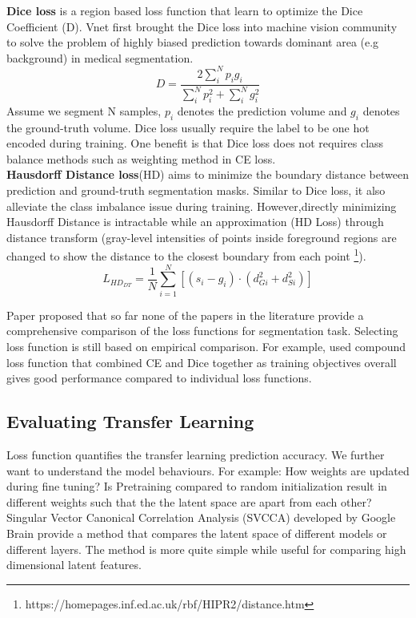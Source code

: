 \textbf{Dice loss} is a region based loss function that learn to optimize the Dice Coefficient (D). Vnet \cite{milletari_v-net_2016} first brought the Dice loss into machine vision community to solve the problem of highly biased prediction towards dominant area (e.g background) in medical segmentation.
 $$D=\frac{2 \sum_{i}^{N} p_{i} g_{i}}{\sum_{i}^{N} p_{i}^{2}+\sum_{i}^{N} g_{i}^{2}}$$
 Assume we segment N samples, $p_{i}$ denotes the prediction volume and $g_{i}$ denotes the ground-truth volume.
Dice loss usually require the label to be one hot encoded during training. One benefit is that Dice loss does not requires class balance methods such as weighting method in CE loss.\\

\textbf{Hausdorff Distance loss}(HD) aims to minimize the boundary distance between prediction and ground-truth segmentation masks. Similar to Dice loss, it also alleviate the class imbalance issue during training. However,directly minimizing Hausdorff Distance is intractable while an approximation (HD Loss) through distance transform (gray-level intensities of points inside foreground regions are changed to show the distance to the closest boundary from each point \footnote{https://homepages.inf.ed.ac.uk/rbf/HIPR2/distance.htm}).
$$L_{H D_{D T}}=\frac{1}{N} \sum_{i=1}^{N}\left[\left(s_{i}-g_{i}\right) \cdot\left(d_{G i}^{2}+d_{S i}^{2}\right)\right]$$

Paper \cite{ma_segmentation_2020} proposed that so far none of the papers in the literature provide a comprehensive comparison of the loss functions for segmentation task. Selecting loss function is still based on empirical comparison. For example, \cite{DBLP:journals/corr/abs-1809-10486} used compound loss function that combined CE and Dice together as training objectives overall gives good performance compared to individual loss functions.

\subsection{Evaluating Transfer Learning}
Loss function quantifies the transfer learning prediction accuracy. We further want to understand the model behaviours. For example: How weights are updated during fine tuning? Is Pretraining compared to random initialization result in different weights such that the the latent space are apart from each other?\\

Singular Vector Canonical Correlation Analysis (SVCCA) \cite{raghu_svcca_2017} developed by Google Brain provide a method that compares the latent space of different models or different layers. The method is more quite simple while useful for comparing high dimensional latent features.\\

